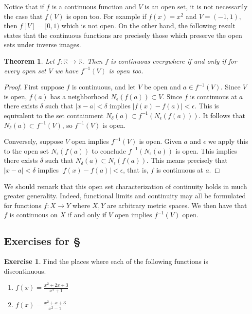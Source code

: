 \documentclass[11pt,oneside]{amsbook}
\newcommand{\R}{\mathbb R}
\theoremstyle{definition}
\newtheorem{exerc}{Exercise}[section]
\theoremstyle{plain}
\newtheorem{theorem}{Theorem}[section]
\theoremstyle{definition}
\theoremstyle{remark}
\numberwithin{equation}{section}
\numberwithin{figure}{section}
\begin{document}
Notice that if $f$ is a continuous function and $V$ is an open set, it is not necessarily the case that $f(V)$ is open too. For example if $f(x)=x^2$ and $V=(-1,1)$, then $f[V]=[0,1)$ which is not open. On the other hand, the following result states that the continuous functions are precisely those which preserve the open sets under inverse images.

\begin{theorem}
  Let $f\colon\R\to\R$. Then $f$ is continuous everywhere if and only if for every open set $V$ we have $f^{-1}(V)$ is open too.
\end{theorem}

\begin{proof}
  First suppose $f$ is continuous, and let $V$ be open and $a\in f^{-1}(V)$. Since $V$ is open, $f(a)$ has a neighborhood $N_\epsilon(f(a))\subset V$. Since $f$ is continuous at $a$ there exists $\delta$ such that $|x-a|<\delta$ implies $|f(x)-f(a)|<\epsilon$. This is equivalent to the set containment $N_\delta(a)\subset f^{-1}(N_\epsilon(f(a)))$. It follows that $N_\delta(a)\subset f^{-1}(V)$, so $f^{-1}(V)$ is open.
  
  Conversely, suppose $V$ open implies $f^{-1}(V)$ is open. Given $a$ and $\epsilon$ we apply this to the open set $N_\epsilon(f(a))$ to conclude $f^{-1}(N_\epsilon(a))$ is open. This implies there exists $\delta$ such that $N_\delta(a)\subset N_\epsilon(f(a))$. This means precisely that $|x-a|<\delta$ implies $|f(x)-f(a)|<\epsilon$, that is, $f$ is continuous at $a$.
\end{proof}

We should remark that this open set characterization of continuity holds in much greater generality. Indeed, functional limits and continuity may all be formulated for functions $f\colon X\to Y$ where $X,Y$ are arbitrary metric spaces. We then have that $f$ is continuous on $X$ if and only if $V$ open implies $f^{-1}(V)$ open.

\newpage
\subsection*{Exercises for \S \thesection}


\begin{exerc}
  Find the places where each of the following functions is discontinuous.
  \begin{enumerate}
    \item $\displaystyle f(x)=\frac{x^2+2x+3}{x^2+1}$
    \item $\displaystyle f(x)=\frac{x^2+x+3}{x^2-1}$
  \end{enumerate}
\end{exerc}
  
\end{document}
